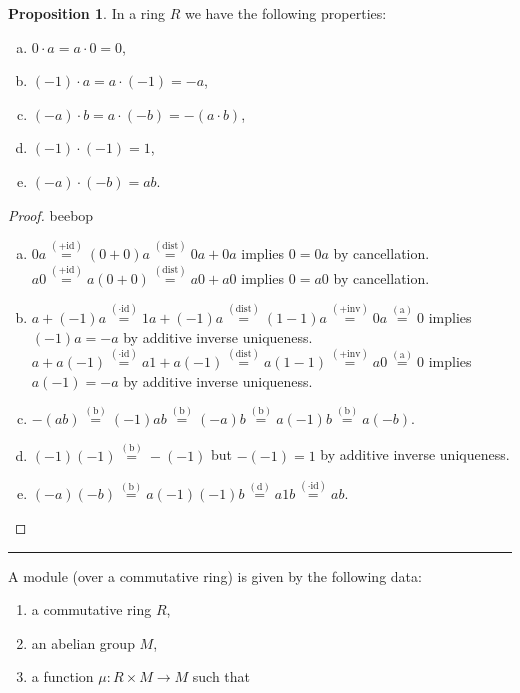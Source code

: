 \documentclass[12pt]{article}
\newcommand{\keyword}[1]{\textbf{#1}}
\newcommand{\sepline}{\rule{\textwidth}{0.4pt}}
\newenvironment{cd}{\begin{center}\begin{tikzcd}}{\end{tikzcd}\end{center}}
\theoremstyle{definition}
\newtheorem{proposition}{Proposition}
\newcommand{\<}{\left\langle}
\renewcommand{\>}{\right\rangle}
\newcommand{\eqby}[1]{\overset{\mathrm{(#1)}}{=}}
\DeclareMathOperator{\id}{id}
\begin{document}
\begin{proposition}
    In a ring $R$ we have the following properties:
    \begin{enumerate}[(a)]
        \item $0 \cdot a = a \cdot 0 = 0$,
        \item $(-1) \cdot a = a \cdot (-1) = -a$,
        \item $(-a) \cdot b = a \cdot (-b) = -(a \cdot b)$,
        \item $(-1) \cdot (-1) = 1$,
        \item $(-a) \cdot (-b) = ab$.
    \end{enumerate}
\end{proposition}
\begin{proof}
    beebop
    \begin{enumerate}[(a)]
        \item $0a \eqby{+ id} (0 + 0)a \eqby{dist} 0a + 0a$ implies $0 = 0a$ by cancellation. \\
        $a0 \eqby{+ id} a(0 + 0) \eqby{dist} a0 + a0$ implies $0 = a0$ by cancellation.
        \item $a + (-1)a \eqby{\cdot id} 1a + (-1)a \eqby{dist} (1 - 1)a \eqby{+inv} 0a \eqby{a} 0$ implies $(-1)a = -a$ by additive inverse uniqueness. \\
        $a + a(-1) \eqby{\cdot id} a1 + a(-1) \eqby{dist} a(1 - 1) \eqby{+inv} a0 \eqby{a} 0$ implies $a(-1) = -a$ by additive inverse uniqueness.
        \item $-(ab) \eqby{b} (-1)ab \eqby{b} (-a)b \eqby{b} a(-1)b \eqby{b} a(-b)$.
        \item $(-1)(-1) \eqby{b} -(-1)$ but $-(-1) = 1$ by additive inverse uniqueness.
        \item $(-a)(-b) \eqby{b} a(-1)(-1)b \eqby{d} a1b \eqby{\cdot id} ab$.
    \end{enumerate}
\end{proof}

\sepline

A \keyword{}{module} (over a commutative ring) is given by the following data:
\begin{enumerate}[(1)]
    \item a commutative ring $R$,
    \item an abelian group $M$,
    \item a function $\mu : R \times M \to M$ such that
\end{enumerate} 
\end{document}
